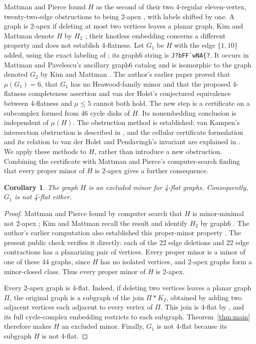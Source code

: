 \documentclass[11pt]{article}
\newtheorem{corollary}[theorem]{Corollary}
\begin{document}
Mattman and Pierce found $H$ as the second of their two 4-regular
eleven-vertex, twenty-two-edge obstructions to being 2-apex
\cite[\S2]{MPi}, with labels shifted by one. A graph is 2-apex if
deleting at most two vertices leaves a planar graph. Kim and Mattman
denote $H$ by $H_2$ \cite[\S\S3.1, 3.3]{KM}; their knotless embedding
concerns a different property and does not establish 4-flatness.
Let $G_1$ be $H$ with the edge $\{1,10\}$ added, using the exact
labeling of \cite{Graham};
its graph6 string is \verb|J?bFF`wNA{?|.
It occurs in Mattman and Pavelescu's ancillary graph6 catalog
\cite[Appendix A, entry 90 with zero-based indexing]{MP}
and is isomorphic to the graph denoted $G_2$ by Kim and Mattman
\cite[\S3]{KM}.
The author's earlier paper \cite[Theorem 1 and Corollary 3]{Graham} proved
that $\mu(G_1)=6$, that $G_1$ has no Heawood-family minor and that the proposed
4-flatness completeness assertion and van der Holst's conjectured equivalence
between 4-flatness and $\mu\le5$ cannot both hold.
The new step is a certificate on a subcomplex formed from 46 cycle
disks of $H$. Its nonembedding conclusion is independent of $\mu(H)$.
The obstruction method is established: van Kampen's intersection
obstruction is described in \cite[Appendix D]{MTW}, and the cellular
certificate formulation and its relation to van der Holst and Pendavingh's
invariant are explained in \cite[Appendix B]{KT}.
We apply these methods to $H$, rather than introduce a new obstruction.
Combining the certificate with Mattman and Pierce's computer-search
finding that every proper minor of $H$ is 2-apex \cite[\S2]{MPi}
gives a further consequence.

\begin{corollary}\label{cor:minimal}
The graph $H$ is an excluded minor for 4-flat graphs. Consequently,
$G_1$ is not 4-flat either.
\end{corollary}
\begin{proof}
Mattman and Pierce found by computer search that $H$ is minor-minimal
not 2-apex \cite[\S2]{MPi}; Kim and Mattman recall the result and identify
$H_2$ by graph6 \cite[\S3.3]{KM}. The author's earlier computation
also established this proper-minor property \cite[Lemma 8]{Graham}.
The present public check verifies it directly: each of the 22 edge
deletions and 22 edge contractions has a planarizing pair of vertices.
Every proper minor is a minor of one of these 44 graphs, since $H$ has
no isolated vertices, and 2-apex graphs form a minor-closed class.
Thus every proper minor of $H$ is 2-apex.

Every 2-apex graph is 4-flat. Indeed, if deleting two vertices leaves
a planar graph $\Pi$, the original graph is a subgraph of the join
$\Pi*K_2$, obtained by adding two adjacent vertices each adjacent to
every vertex of $\Pi$. This join is 4-flat by
\cite[Theorem 5.9(ii)]{GW}, and its full cycle-complex embedding restricts
to each subgraph. Theorem~\ref{thm:main} therefore makes $H$ an excluded
minor. Finally, $G_1$ is not 4-flat because its subgraph $H$ is not 4-flat.
\end{proof}
\end{document}
